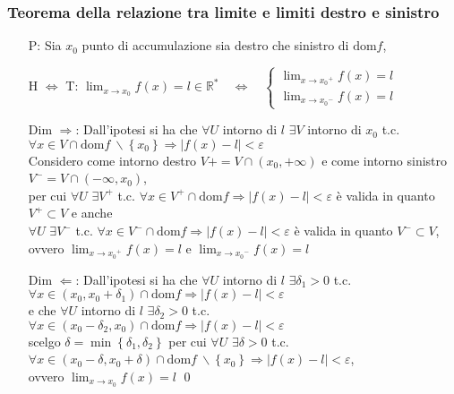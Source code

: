 \documentclass[a4paper]{article}
\newcommand\dom{\text{dom}}
\begin{document}
\subsubsection*{Teorema della relazione tra limite e limiti destro e sinistro}
\begin{itemize}
	\item[P: ] Sia \(x_0\) punto di accumulazione sia destro che sinistro di \(\dom f\),
	\item[H \(\Leftrightarrow\) T: ] \(\displaystyle \lim_{x \to x_0} f(x) = l \in \mathbb{R}^* \quad \Leftrightarrow \quad
	\begin{cases}
		\displaystyle \lim_{x \to {x_0}^+} f(x) = l \\
		\displaystyle \lim_{x \to {x_0}^-} f(x) = l
	\end{cases}
	\)

	\item[Dim \(\Rightarrow\): ] Dall'ipotesi si ha che \(\forall U\) intorno di \(l\) \(\exists V\) intorno di \(x_0\) t.c. \(\forall x \in V \cap \dom f \  \backslash \left\{ x_0 \right\} \Rightarrow \left| f(x) - l \right| < \varepsilon\) \\
	Considero come intorno destro \(V+ = V \cap \left( x_0, + \infty \right) \) e come intorno sinistro \(V^- = V \cap \left( -\infty, x_0 \right)\), \\
	per cui \(\forall U\) \(\exists V^+\) t.c. \(\forall x \in V^+ \cap \dom f \Rightarrow \left| f(x) - l \right| < \varepsilon\) è valida in quanto \(V^+ \subset V\) e anche \\
	\(\forall U\) \(\exists V^-\) t.c. \(\forall x \in V^- \cap \dom f \Rightarrow \left| f(x) - l \right| < \varepsilon\) è valida in quanto \(V^- \subset V\), \\
	ovvero \(\displaystyle \lim_{x \to {x_0}^+} f(x) = l\) e \(\displaystyle \lim_{x \to {x_0}^-} f(x) = l\)
	
	\item[Dim \(\Leftarrow\): ] Dall'ipotesi si ha che \(\forall U\) intorno di \(l\) \(\exists \delta_1 > 0\) t.c. \(\forall x \in \left( x_0, x_0 + \delta_1 \right) \cap \dom f \Rightarrow \left| f(x) - l \right| < \varepsilon\) \\
	e che \(\forall U\) intorno di \(l\) \(\exists \delta_2 > 0\) t.c. \(\forall x \in \left( x_0 - \delta_2, x_0 \right) \cap \dom f \Rightarrow \left| f(x) - l \right| < \varepsilon\) \\
	scelgo \(\delta = \min \left\{ \delta_1, \delta_2 \right\}\) per cui \(\forall U\) \(\exists \delta > 0\) t.c. \(\forall x \in \left( x_0 - \delta, x_0 + \delta \right) \cap \dom f \  \backslash \left\{ x_0 \right\} \Rightarrow \left| f(x) - l \right| < \varepsilon\), \\
	ovvero \(\displaystyle \lim_{x \to x_0} f(x) = l\) \qed
\end{itemize}
\end{document}
